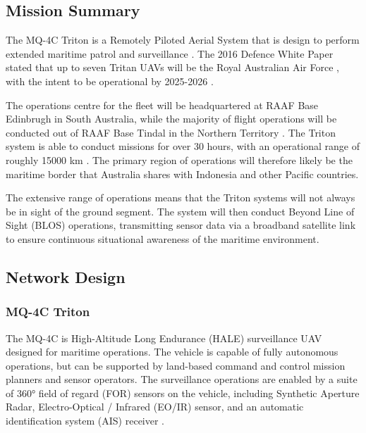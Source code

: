 \documentclass[12pt]{article}
\begin{document}
\subsection{Mission Summary}
The MQ-4C Triton is a Remotely Piloted Aerial System that is design to perform extended maritime patrol and surveillance \cite{airforce}. The 2016 Defence White Paper stated that up to seven Tritan UAVs will be the Royal Australian Air Force \cite{generalreport}, with the intent to be operational by 2025-2026 \cite{defencegov}. 

The operations centre for the fleet will be headquartered at RAAF Base Edinbrugh in South Australia, while the majority of flight operations will be conducted out of RAAF Base Tindal in the Northern Territory \cite{defencegov}. The Triton system is able to conduct missions for over 30 hours, with an operational range of roughly 15000 km \cite{northrop}. 
The primary region of operations will therefore likely be the maritime border that Australia shares with Indonesia and other Pacific countries.

The extensive range of operations means that the Triton systems will not always be in sight of the ground segment. The system will then conduct Beyond Line of Sight (BLOS) operations, transmitting sensor data via a broadband satellite link to ensure continuous situational awareness of the maritime environment. 

\subsection{Network Design}

\subsubsection{MQ-4C Triton \label{sect:triton}}
The MQ-4C is High-Altitude Long Endurance (HALE) surveillance UAV designed for maritime operations. The vehicle is capable of fully autonomous operations, but can be supported by land-based command and control mission planners and sensor operators. The surveillance operations are enabled by a suite of 360° field of regard (FOR) sensors on the vehicle, including Synthetic Aperture Radar, Electro-Optical / Infrared (EO/IR) sensor, and an automatic identification system (AIS) receiver \cite{northropdatasheet}. 
\end{document}

